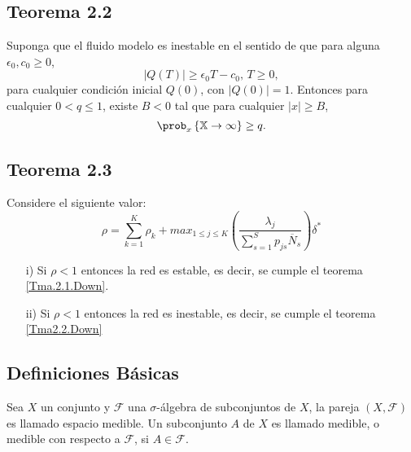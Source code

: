 \subsection{Teorema 2.2}

\begin{Teo}\label{Tma2.2.Down}
Suponga que el fluido modelo es inestable en el sentido de que
para alguna $\epsilon_{0},c_{0}\geq0$,
\begin{equation}\label{Eq.Inestability}
|Q\left(T\right)|\geq\epsilon_{0}T-c_{0}\textrm{,   }T\geq0,
\end{equation}
para cualquier condici\'on inicial $Q\left(0\right)$, con
$|Q\left(0\right)|=1$. Entonces para cualquier $0<q\leq1$, existe
$B<0$ tal que para cualquier $|x|\geq B$,
\begin{equation}
\prob_{x}\left\{\mathbb{X}\rightarrow\infty\right\}\geq q.
\end{equation}
\end{Teo}

\subsection{Teorema 2.3}
\begin{Teo}\label{Tma2.3.Down}
Considere el siguiente valor:
\begin{equation}\label{Eq.Rho.1serv}
\rho=\sum_{k=1}^{K}\rho_{k}+max_{1\leq j\leq K}\left(\frac{\lambda_{j}}{\sum_{s=1}^{S}p_{js}\overline{N}_{s}}\right)\delta^{*}
\end{equation}
\begin{itemize}
\item[i)] Si $\rho<1$ entonces la red es estable, es decir, se cumple el teorema \ref{Tma.2.1.Down}.

\item[ii)] Si $\rho<1$ entonces la red es inestable, es decir, se cumple el teorema \ref{Tma2.2.Down}
\end{itemize}
\end{Teo}
\newpage
\subsection{Definiciones  B\'asicas}
\begin{Def}
Sea $X$ un conjunto y $\mathcal{F}$ una $\sigma$-\'algebra de
subconjuntos de $X$, la pareja $\left(X,\mathcal{F}\right)$ es
llamado espacio medible. Un subconjunto $A$ de $X$ es llamado
medible, o medible con respecto a $\mathcal{F}$, si
$A\in\mathcal{F}$.
\end{Def}

